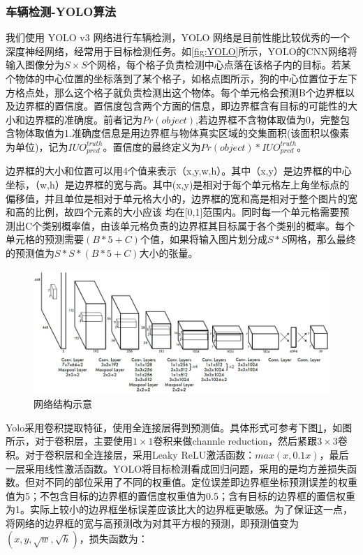 \subsubsection{车辆检测-YOLO算法}

我们使用 YOLO v3 网络进行车辆检测，YOLO 网络是目前性能比较优秀的一个深度神经网络，经常用于目标检测任务。如\ref{fig:YOLO}所示，YOLO的CNN网络将输入图像分为$S\times S$个网格，每个格子负责检测中心点落在该格子内的目标。若某个物体的中心位置的坐标落到了某个格子，如格点图所示，狗的中心位置位于左下方格点处，那么这个格子就负责检测出这个物体。每个单元格会预测B个边界框以及边界框的置信度。置信度包含两个方面的信息，即边界框含有目标的可能性的大小和边界框的准确度。前者记为$Pr(object)$,若边界框不含物体取值为0，完整包含物体取值为1.准确度信息是用边界框与物体真实区域的交集面积(该面积以像素为单位)，记为$IUO^{truth}_{pred}$。置信度的最终定义为$Pr(object)*IUO^{truth}_{pred}$。

边界框的大小和位置可以用4个值来表示（x,y,w,h）。其中（x,y）是边界框的中心坐标，（w,h）是边界框的宽与高。其中(x,y)是相对于每个单元格左上角坐标点的偏移值，并且单位是相对于单元格大小的，边界框的宽和高是相对于整个图片的宽和高的比例，故四个元素的大小应该 均在[0,1]范围内。同时每一个单元格需要预测出C个类别概率值，由该单元格负责的边界框其目标属于各个类别的概率。每个单元格的预测需要$(B*5+C)$个值，如果将输入图片划分成$S*S$网格，那么最终的预测值为$S*S*(B*5+C)$大小的张量。

\begin{figure}[H]
    \centering
    \includegraphics[scale=0.1]{figures/网络结构.jpg}
    \caption{网络结构示意}
    \label{fig:网络}
\end{figure}

Yolo采用卷积提取特征，使用全连接层得到预测值。具体形式可参考下图\ref{fig:网络}，如图所示，对于卷积层，主要使用$1 \times 1$卷积来做channle reduction，然后紧跟$3 \times 3$卷积。对于卷积层和全连接层，采用Leaky ReLU激活函数：$max(x,0.1x)$，最后一层采用线性激活函数。YOLO将目标检测看成回归问题，采用的是均方差损失函数。但对不同的部位采用了不同的权重值。定位误差即边界框坐标预测误差的权重值为5；不包含目标的边界框的置信度权重值为0.5；含有目标的边界框的置信权重为1。实际上较小的边界框坐标误差应该比大的边界框更敏感。为了保证这一点，将网络的边界框的宽与高预测改为对其平方根的预测，即预测值变为$(x,y,{\sqrt{w}},\sqrt{h})$，损失函数为：

